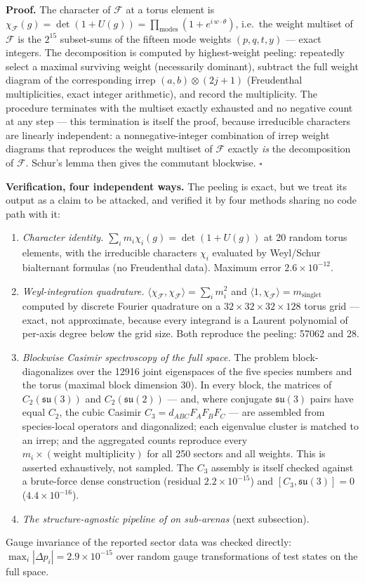 \documentclass[11pt]{article}
\newcommand{\Fock}{\mathcal{F}}
\newcommand{\su}[1]{\mathfrak{su}(#1)}
\begin{document}
\noindent\textbf{Proof.} The character of $\Fock$ at a torus element is $\chi_\Fock(g) = \det(1 + U(g)) = \prod_{\mathrm{modes}}(1 + e^{i\,w\cdot\theta})$, i.e.\ the weight multiset of $\Fock$ is the $2^{15}$ subset-sums of the fifteen mode weights $(p,q,t,y)$ --- exact integers. The decomposition is computed by highest-weight peeling: repeatedly select a maximal surviving weight (necessarily dominant), subtract the full weight diagram of the corresponding irrep $(a,b)\otimes(2j{+}1)$ (Freudenthal multiplicities, exact integer arithmetic), and record the multiplicity. The procedure terminates with the multiset exactly exhausted and no negative count at any step --- this termination is itself the proof, because irreducible characters are linearly independent: a nonnegative-integer combination of irrep weight diagrams that reproduces the weight multiset of $\Fock$ exactly \emph{is} the decomposition of $\Fock$. Schur's lemma then gives the commutant blockwise. \hfill$\square$

\medskip

\noindent\textbf{Verification, four independent ways.} The peeling is exact, but we treat its output as a claim to be attacked, and verified it by four methods sharing no code path with it:
\begin{enumerate}
\item \emph{Character identity.} $\sum_i m_i\chi_i(g) = \det(1+U(g))$ at 20 random torus elements, with the irreducible characters $\chi_i$ evaluated by Weyl/Schur bialternant formulas (no Freudenthal data). Maximum error $2.6\times10^{-12}$.
\item \emph{Weyl-integration quadrature.} $\langle\chi_\Fock,\chi_\Fock\rangle = \sum_i m_i^2$ and $\langle 1,\chi_\Fock\rangle = m_{\mathrm{singlet}}$ computed by discrete Fourier quadrature on a $32\times32\times32\times128$ torus grid --- exact, not approximate, because every integrand is a Laurent polynomial of per-axis degree below the grid size. Both reproduce the peeling: 57062 and 28.
\item \emph{Blockwise Casimir spectroscopy of the full space.} The problem block-diagonalizes over the 12916 joint eigenspaces of the five species numbers and the torus (maximal block dimension 30). In every block, the matrices of $C_2(\su3)$ and $C_2(\su2)$ --- and, where conjugate $\su3$ pairs have equal $C_2$, the cubic Casimir $C_3 = d_{ABC}F_AF_BF_C$ --- are assembled from species-local operators and diagonalized; each eigenvalue cluster is matched to an irrep; and the aggregated counts reproduce every $m_i\times(\text{weight multiplicity})$ for all 250 sectors and all weights. This is asserted exhaustively, not sampled. The $C_3$ assembly is itself checked against a brute-force dense construction (residual $2.2\times10^{-15}$) and $[C_3, \su3] = 0$ ($4.4\times10^{-16}$).
\item \emph{The structure-agnostic pipeline of \cite{p2} on sub-arenas} (next subsection).
\end{enumerate}
Gauge invariance of the reported sector data was checked directly: $\max_i|\Delta p_i| = 2.9\times10^{-15}$ over random gauge transformations of test states on the full space.
\end{document}
